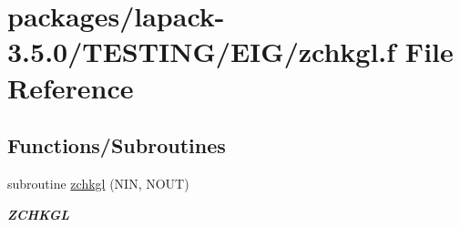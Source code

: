 \hypertarget{zchkgl_8f}{}\section{packages/lapack-\/3.5.0/\+T\+E\+S\+T\+I\+N\+G/\+E\+I\+G/zchkgl.f File Reference}
\label{zchkgl_8f}
\subsection*{Functions/\+Subroutines}
\begin{DoxyCompactItemize}
\item 
subroutine \hyperlink{group__complex16__eig_ga2452dadb41e2405e8c575902c4b7a2a2}{zchkgl} (N\+I\+N, N\+O\+U\+T)
\begin{DoxyCompactList}\small\item\em {\bfseries Z\+C\+H\+K\+G\+L} \end{DoxyCompactList}\end{DoxyCompactItemize}
